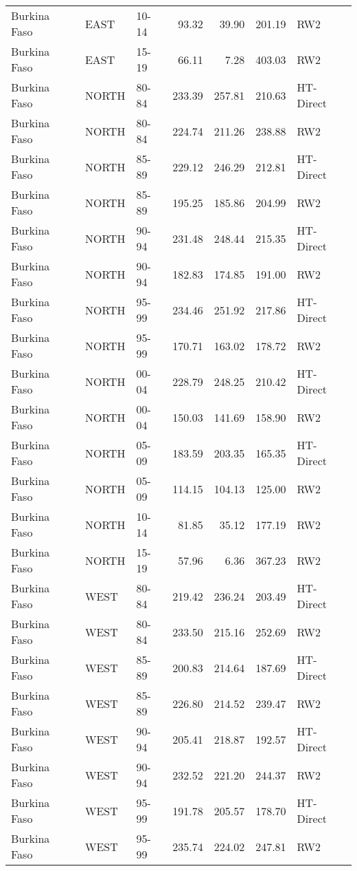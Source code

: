 \begin{longtable}{lllrrrl}
  Burkina Faso & EAST & 10-14 & 93.32 & 39.90 & 201.19 & RW2 \\ 
  Burkina Faso & EAST & 15-19 & 66.11 & 7.28 & 403.03 & RW2 \\ 
  Burkina Faso & NORTH & 80-84 & 233.39 & 257.81 & 210.63 & HT-Direct \\ 
  Burkina Faso & NORTH & 80-84 & 224.74 & 211.26 & 238.88 & RW2 \\ 
  Burkina Faso & NORTH & 85-89 & 229.12 & 246.29 & 212.81 & HT-Direct \\ 
  Burkina Faso & NORTH & 85-89 & 195.25 & 185.86 & 204.99 & RW2 \\ 
  Burkina Faso & NORTH & 90-94 & 231.48 & 248.44 & 215.35 & HT-Direct \\ 
  Burkina Faso & NORTH & 90-94 & 182.83 & 174.85 & 191.00 & RW2 \\ 
  Burkina Faso & NORTH & 95-99 & 234.46 & 251.92 & 217.86 & HT-Direct \\ 
  Burkina Faso & NORTH & 95-99 & 170.71 & 163.02 & 178.72 & RW2 \\ 
  Burkina Faso & NORTH & 00-04 & 228.79 & 248.25 & 210.42 & HT-Direct \\ 
  Burkina Faso & NORTH & 00-04 & 150.03 & 141.69 & 158.90 & RW2 \\ 
  Burkina Faso & NORTH & 05-09 & 183.59 & 203.35 & 165.35 & HT-Direct \\ 
  Burkina Faso & NORTH & 05-09 & 114.15 & 104.13 & 125.00 & RW2 \\ 
  Burkina Faso & NORTH & 10-14 & 81.85 & 35.12 & 177.19 & RW2 \\ 
  Burkina Faso & NORTH & 15-19 & 57.96 & 6.36 & 367.23 & RW2 \\ 
  Burkina Faso & WEST & 80-84 & 219.42 & 236.24 & 203.49 & HT-Direct \\ 
  Burkina Faso & WEST & 80-84 & 233.50 & 215.16 & 252.69 & RW2 \\ 
  Burkina Faso & WEST & 85-89 & 200.83 & 214.64 & 187.69 & HT-Direct \\ 
  Burkina Faso & WEST & 85-89 & 226.80 & 214.52 & 239.47 & RW2 \\ 
  Burkina Faso & WEST & 90-94 & 205.41 & 218.87 & 192.57 & HT-Direct \\ 
  Burkina Faso & WEST & 90-94 & 232.52 & 221.20 & 244.37 & RW2 \\ 
  Burkina Faso & WEST & 95-99 & 191.78 & 205.57 & 178.70 & HT-Direct \\ 
  Burkina Faso & WEST & 95-99 & 235.74 & 224.02 & 247.81 & RW2 \\ 

\end{longtable}
